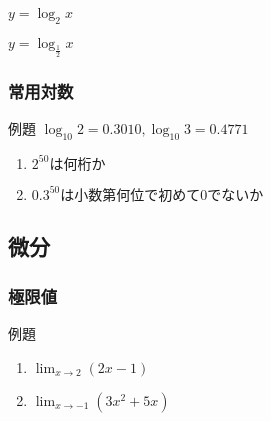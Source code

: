 \documentclass[10pt,dvipdfmx]{jsarticle}
\begin{document}
\begin{table}[H]
  \begin{minipage}{0.5\linewidth}
    $y=\log_{2}x$
    \begin{center}
    \end{center}
  \end{minipage}
  \begin{minipage}{0.5\linewidth}
    $y=\log_{\frac{1}{2}}x$
    \begin{center}
    \end{center}
  \end{minipage}
\end{table}

\subsubsection*{常用対数}
\begin{itembox}[l]{例題}
  $\log_{10}2=0.3010, \log_{10}3=0.4771$
  \begin{large}
    \begin{enumerate}
      \item $2^{50}は何桁か$
      \item $0.3^{50}は小数第何位で初めて0でないか$
    \end{enumerate}
  \end{large}
\end{itembox}

\newpage
\subsection*{微分}
\subsubsection*{極限値}
\begin{itembox}[l]{例題}
  \begin{large}
    \begin{multicols}{2}
      \begin{enumerate}
        \item $\lim_{x\rightarrow2}(2x-1)$
        \item $\lim_{x\rightarrow-1}(3x^2+5x)$
      \end{enumerate}
    \end{multicols}
  \end{large}
\end{itembox}
\end{document}
